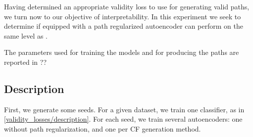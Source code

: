 \documentclass[../main.tex]{subfiles}
\begin{document}
Having determined an appropriate validity loss to use for generating valid paths, we turn now to our objective of interpretability.
In this experiment we seek to determine if \ls{} equipped with a path regularized autoencoder can perform on the same level as \revise{}.




The parameters used for training the models and for producing the paths are reported in ?? 

\subsection{Description}

First, we generate some seeds.
For a given dataset, we train one classifier, as in \autoref{validity_losses/description}.
For each seed, we train several autoencoders: one without path regularization, and one per CF generation method.









\end{document}
